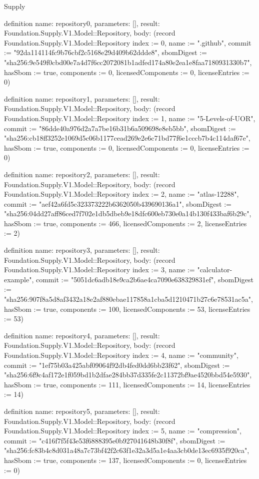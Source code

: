 \begin{lexlean}{Supply}
\begin{semanticmodule}
definition{
  name: repository0,
  parameters: [],
  result: Foundation.Supply.V1.Model::Repository,
  body: (record Foundation.Supply.V1.Model::Repository {index := 0, name := ".github", commit := "92da114114fc9b76cbf2c5168e29d409b62ddde8", sbomDigest := "sha256:9e549f0cbd00e7a4d7f6cc2072081b1adfed174a80e2ea1e8faa7180931330b7", hasSbom := true, components := 0, licensedComponents := 0, licenseEntries := 0})
}

definition{
  name: repository1,
  parameters: [],
  result: Foundation.Supply.V1.Model::Repository,
  body: (record Foundation.Supply.V1.Model::Repository {index := 1, name := "5-Levels-of-UOR", commit := "86dde40a976d2a7a7be16b31b6a509698e8eb5bb", sbomDigest := "sha256:cb18ff3252e1069d5c06b1177cead269e2e6c71bd77f6e1cccb7b4c114daf67e", hasSbom := true, components := 0, licensedComponents := 0, licenseEntries := 0})
}

definition{
  name: repository2,
  parameters: [],
  result: Foundation.Supply.V1.Model::Repository,
  body: (record Foundation.Supply.V1.Model::Repository {index := 2, name := "atlas-12288", commit := "aef42a6fd5c323373222b6362050b439690136a1", sbomDigest := "sha256:04dd27aff86ced7f702e1db5dbeb9e18dfc600eb730e0a14b130f433baf6b29c", hasSbom := true, components := 466, licensedComponents := 2, licenseEntries := 2})
}

definition{
  name: repository3,
  parameters: [],
  result: Foundation.Supply.V1.Model::Repository,
  body: (record Foundation.Supply.V1.Model::Repository {index := 3, name := "calculator-example", commit := "5051dc6adb18e9ca2b6ae4ca7090e638329831ef", sbomDigest := "sha256:907f8a5d8af3432a18e2af880ebae117858a1cba5d1210471b27c6e78531ac5a", hasSbom := true, components := 100, licensedComponents := 53, licenseEntries := 53})
}

definition{
  name: repository4,
  parameters: [],
  result: Foundation.Supply.V1.Model::Repository,
  body: (record Foundation.Supply.V1.Model::Repository {index := 4, name := "community", commit := "1ef75b03a425abf09064f92db4fed0dd6bb23f62", sbomDigest := "sha256:6f9c4af172e1f059bd1b2dfae284bb37d335fe2c11372bf9ae4520bbd54e5930", hasSbom := true, components := 111, licensedComponents := 14, licenseEntries := 14})
}

definition{
  name: repository5,
  parameters: [],
  result: Foundation.Supply.V1.Model::Repository,
  body: (record Foundation.Supply.V1.Model::Repository {index := 5, name := "compression", commit := "c416f7f5f43e53f6888395e0b927041648b30f8f", sbomDigest := "sha256:fc83b4c8d031a48a7c73bf42f2c63f1e32a3d5a1e4aa3cb0de13ec6935f920ca", hasSbom := true, components := 137, licensedComponents := 0, licenseEntries := 0})
}


\end{semanticmodule}
\end{lexlean}
